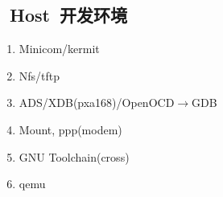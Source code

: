 \documentclass[a4paper,11pt]{article}
\begin{document}
\begin{CJK*}{UTF8}{gbsn}
\subsection{~Host~开发环境}
\begin{enumerate}
\item Minicom/kermit 
\item Nfs/tftp 
\item ADS/XDB(pxa168)/OpenOCD$\rightarrow$GDB
\item Mount, ppp(modem)
\item GNU Toolchain(cross)
\item qemu
\end{enumerate}

% 
% 
% 
% 
% 
% 

\end{CJK*}
\end{document}
